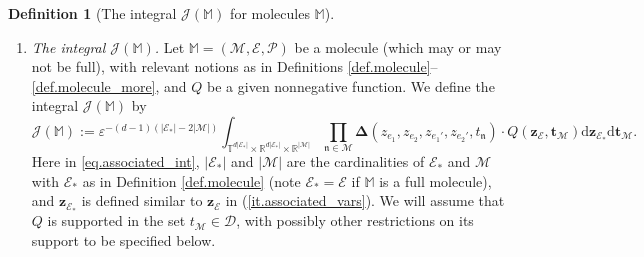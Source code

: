 \documentclass[10pt, reqno]{amsart}
\newcommand{\Mb}{\mathbb M}
\newcommand{\Rb}{\mathbb R}
\newcommand{\Tb}{\mathbb T}
\newcommand{\Dc}{\mathcal D}
\newcommand{\Ec}{\mathcal E}
\newcommand {\Jc}{\mathcal J}
\renewcommand{\Mc}{\mathcal M}
\newcommand{\Pc}{\mathcal P}
\newcommand{\nf}{\mathfrak n}
\newcommand{\vz}{\boldsymbol{z}}
\newcommand{\vt}{\boldsymbol{t}}
\theoremstyle{definition}
\newtheorem{definition}[theorem]{Definition}
\theoremstyle{remark}
\numberwithin{equation}{section}
\begin{document}
\begin{definition}[The integral $\Jc(\Mb)$ for molecules $\Mb$]
\begin{enumerate}
\begin{equation}
    \end{equation} Here $1\gg\tau>(\log|\log\varepsilon|)^{-1/2}$ is a small parameter (for the exact choice see Section \ref{sec.proof_main}, \textbf{Part 7}).  
    \item\label{it.associated_int} \emph{The integral $\Jc(\Mb)$.} Let $\Mb=(\Mc,\Ec,\Pc)$ be a molecule (which may or may not be full), with relevant notions as in Definitions \ref{def.molecule}--\ref{def.molecule_more}, and $Q$ be a given nonnegative function. We define the integral $\Jc(\Mb)$ by
    \begin{equation}\label{eq.associated_int}
        \Jc(\Mb):=\varepsilon^{-(d-1)(|\Ec_*|-2|\Mc|)}\int_{\Tb^{d|\Ec_*|}\times\mathbb{R}^{d|\Ec_*|}\times \Rb^{|\Mc|}}\prod_{\nf\in\Mc}\boldsymbol{\Delta}(z_{e_1},z_{e_2},z_{e_1'},z_{e_2'},t_\nf)\cdot Q(\vz_\Ec,\vt_\Mc)\mathrm{d}\vz_{\Ec_*}\mathrm{d}\vt_\Mc.
    \end{equation}
    Here in \eqref{eq.associated_int}, $|\Ec_*|$ and $|\Mc|$ are the cardinalities of $\Ec_*$ and $\Mc$ with $\Ec_*$ as in Definition \ref{def.molecule} (note $\Ec_*=\Ec$ if $\Mb$ is a full molecule), and $\vz_{\Ec_*}$ is defined similar to $\vz_\Ec$ in (\ref{it.associated_vars}). We will assume that $Q$ is supported in the set $t_\Mc\in\Dc$, with possibly other restrictions on its support to be specified below.
    \end{enumerate}
\end{definition}
\end{document}
